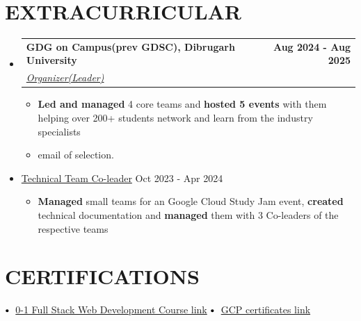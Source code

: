 \documentclass[a4paper,11pt]{article}
\makeatletter
\newcommand{\resumeItem}[1]{
    \item\small{
            {#1 \vspace{-2pt}}
        }
    }
\newcommand{\resumeSubheading}[4]{
        \vspace{-2pt}\item
        \begin{tabular*}{1.0\textwidth}[t]{l@{\extracolsep{\fill}}r}
            \textbf{\large#1} & \textbf{\small #2} \\
            \textit{\large#3} & \textit{\small #4} \\

        \end{tabular*}\vspace{-7pt}
    }
\newcommand{\resumeSubHeadingListStart}{\begin{itemize}[leftmargin=0.0in, label={}]}
\newcommand{\resumeSubHeadingListEnd}{\end{itemize}}
\newcommand{\resumeItemListStart}{\begin{itemize}}
\newcommand{\resumeItemListEnd}{\end{itemize}\vspace{-6pt}}
\newcommand\sbullet[1][.5]{\mathbin{\vcenter{\hbox{\scalebox{#1}{$\bullet$}}}}}
\makeatother
\begin{document}
\section{EXTRACURRICULAR}
\resumeSubHeadingListStart
\resumeSubheading{GDG on Campus(prev GDSC), Dibrugarh University\href{https://gdg.community.dev/gdg-on-campus-dibrugarh-university-dibrugarh-india/}{\raisebox{-0.1\height}\faExternalLink}}{Aug 2024 - Aug 2025}{\underline{Organizer(Leader)}}{}
\resumeItemListStart
\resumeItem{\normalsize{\textbf{Led and managed} 4 core teams and \textbf{hosted 5 events} with them helping over 200+ students network and learn from the industry specialists}}
\resumeItem{\normalsize{email of selection.\href{https://www.linkedin.com/in/milinda-barua/overlay/1739075889047/single-media-viewer/?profileId=ACoAAEPBtm4B6hu2mxVjWHK1bhmW2EnUnVz3F6k}{\raisebox{0 \height}\faExternalLink}}}
\resumeItemListEnd
\resumeItem{\normalsize{\underline{Technical Team Co-leader} \hfill Oct 2023 - Apr 2024}}
\resumeItemListStart
\resumeItem{\normalsize{\textbf{Managed} small teams for an Google Cloud Study Jam event, \textbf{created} technical documentation and \textbf{managed} them with 3 Co-leaders of the respective teams}}
\resumeItemListEnd
\resumeSubHeadingListEnd
\vspace{-15pt}

\section{CERTIFICATIONS}

$\sbullet[.75] \hspace{0.1cm}$ \href{https://drive.google.com/file/d/1EH_jUK-UUidX4LybD7Xez974SCDGPA1C/view?usp=sharing}{0-1 Full Stack Web Development Course link} \hspace{1.6cm}
$\sbullet[.75] \hspace{0.1cm}$ {\href{https://www.cloudskillsboost.google/public_profiles/d88db451-eb32-437f-8c4a-39f9006e991e}{GCP certificates \color{blue}link}} \hspace{2.59cm} \\
\end{document}
